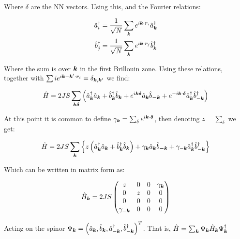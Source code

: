 Where $\delta$ are the NN vectors. Using this, and the Fourier relations:

\begin{align}
\hat{a}_i^\dagger &= \frac{1}{\sqrt{N}} \sum_{\boldsymbol{k}} e^{i \boldsymbol{k} \cdot \boldsymbol{r}_i} \hat{a}_{\boldsymbol{k}}^\dagger \\
\hat{b}_j^\dagger &= \frac{1}{\sqrt{N}} \sum_{\boldsymbol{k}} e^{i \boldsymbol{k} \cdot \boldsymbol{r}_j} \hat{b}_{\boldsymbol{k}}^\dagger
\end{align}

Where the sum is over $\boldsymbol{k}$ in the first Brillouin zone. Using these relations, together with $\sum{i} e^{i{\boldsymbol{k}-\boldsymbol{k}'}\cdot\boldsymbol{r}_i} = \delta_{\boldsymbol{k}, \boldsymbol{k}'}$ we find:

\begin{equation}
\hat{H} = 2JS \sum_{\boldsymbol{k} \boldsymbol{\delta}} \left( \hat{a}^\dagger_{\boldsymbol{k}}\hat{a}_{\boldsymbol{k}} + \hat{b}^\dagger_{\boldsymbol{k}}\hat{b}_{\boldsymbol{k}} + e^{i\boldsymbol{k}\boldsymbol{\delta}}\hat{a}_{\boldsymbol{k}}\hat{b}_{\boldsymbol{-k}} + e^{-i \boldsymbol{k}\cdot\boldsymbol{\delta}}  \hat{a}^\dagger_{\boldsymbol{k}}\hat{b}^\dagger_{-\boldsymbol{k}} \right)
\end{equation}

At this point it is common to define $\gamma_{\boldsymbol{k}} = \sum_\delta e^{i \boldsymbol{k} \cdot \boldsymbol{\delta}}$, then denoting $z = \sum_\delta$ we get:

\begin{equation}
\hat{H} = 2JS \sum_{\boldsymbol{k}} \left\{ z \left( \hat{a}^\dagger_{\boldsymbol{k}}\hat{a}_{\boldsymbol{k}} + \hat{b}^\dagger_{\boldsymbol{k}}\hat{b}_{\boldsymbol{k}} \right) + \gamma_{\boldsymbol{k}}\hat{a}_{\boldsymbol{k}}\hat{b}_{\boldsymbol{-k}} + \gamma_{-\boldsymbol{k}}\hat{a}^\dagger_{\boldsymbol{k}}\hat{b}^\dagger_{-\boldsymbol{k}} \right\}
\end{equation}

Which can be written in matrix form as:

\begin{equation}
\hat{H}_{\boldsymbol{k}} = 2JS\begin{pmatrix} 
z & 0 & 0 & \gamma_{\boldsymbol{k}} \\
0 & z & 0 & 0 \\
0 & 0 & 0 & 0 \\
\gamma_{-\boldsymbol{k}} & 0 & 0 & 0 
\end{pmatrix}
\end{equation}

Acting on the spinor $\Psi_{\boldsymbol{k}} = \left(\hat{a}_{\boldsymbol{k}},\hat{b}_{\boldsymbol{k}},\hat{a}_{-\boldsymbol{k}}^\dagger,\hat{b}_{-\boldsymbol{k}}^\dagger \right)^T$. That is, $\hat{H} = \sum_{\boldsymbol{k}} \Psi_{\boldsymbol{k}} \hat{H}_{\boldsymbol{k}} \Psi^\dagger_{\boldsymbol{k}}$